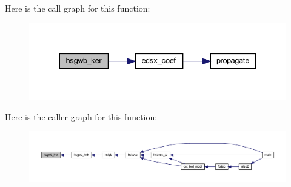 Here is the call graph for this function\+:\nopagebreak
\begin{figure}[H]
\begin{center}
\leavevmode
\includegraphics[width=336pt]{Leroi_8f90_ad4730d65d0e42fe38f0f174339af3c71_cgraph}
\end{center}
\end{figure}
Here is the caller graph for this function\+:\nopagebreak
\begin{figure}[H]
\begin{center}
\leavevmode
\includegraphics[width=350pt]{Leroi_8f90_ad4730d65d0e42fe38f0f174339af3c71_icgraph}
\end{center}
\end{figure}
\mbox{\label{Leroi_8f90_a247cf958ed9d5aa90d05eee29e6a9582}} 
